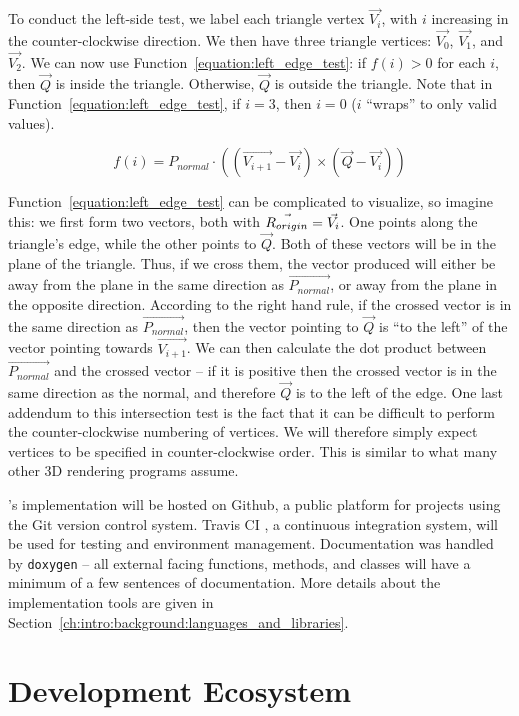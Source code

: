 To conduct the left-side test, we label each triangle vertex $\vec{V_i}$, with $i$ increasing in the counter-clockwise direction.
We then have three triangle vertices: $\vec{V_0}$, $\vec{V_1}$, and $\vec{V_2}$.
We can now use Function~\ref{equation:left_edge_test}: if $f(i) > 0$ for each $i$, then $\vec{Q}$ is inside the triangle.
Otherwise, $\vec{Q}$ is outside the triangle.
Note that in Function~\ref{equation:left_edge_test}, if $i = 3$, then $i = 0$ ($i$ ``wraps'' to only valid values).

\begin{equation}
  \label{equation:left_edge_test}
  f(i) = P_{normal} \cdot ((\vec{V_{i+1}} - \vec{V_i}) \times (\vec{Q} - \vec{V_i}))
\end{equation}

Function~\ref{equation:left_edge_test} can be complicated to visualize, so imagine this: we first form two vectors, both with $\vec{R_{origin}} = \vec{V_i}$.
One points along the triangle's edge, while the other points to $\vec{Q}$.
Both of these vectors will be in the plane of the triangle.
Thus, if we cross them, the vector produced will either be away from the plane in the same direction as $\vec{P_{normal}}$, or away from the plane in the opposite direction.
According to the right hand rule, if the crossed vector is in the same direction as $\vec{P_{normal}}$, then the vector pointing to $\vec{Q}$ is ``to the left'' of the vector pointing towards $\vec{V_{i+1}}$.
We can then calculate the dot product between $\vec{P_{normal}}$ and the crossed vector -- if it is positive then the crossed vector is in the same direction as the normal, and therefore $\vec{Q}$ is to the left of the edge.
One last addendum to this intersection test is the fact that it can be difficult to perform the counter-clockwise numbering of vertices.
We will therefore simply expect vertices to be specified in counter-clockwise order.
This is similar to what many other 3D rendering programs assume.

\name's implementation will be hosted on Github, a public platform for projects using the Git version control system.
Travis CI \cite{travisci}, a continuous integration system, will be used for testing and environment management.
Documentation was handled by \texttt{doxygen} \cite{van2008doxygen} -- all external facing functions, methods, and classes will have a minimum of a few sentences of documentation.
More details about the implementation tools are given in Section~\ref{ch:intro:background:languages_and_libraries}.


\section{Development Ecosystem}
\label{ch:intro:background:development_ecosystem}

